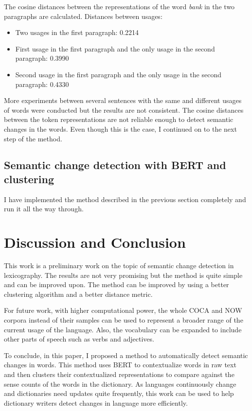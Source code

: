 \documentclass[11pt]{article}
\begin{document}
The cosine distances between the representations of the word \textit{bank} in the two paragraphs are calculated.
Distances between usages:
\begin{itemize}
  \item Two usages in the first paragraph: 0.2214
  \item First usage in the first paragraph and the only usage in the second paragraph: 0.3990
  \item Second usage in the first paragraph and the only usage in the second paragraph: 0.4330
\end{itemize}

More experiments between several sentences with the same and different usages of words were conducted but the results are not consistent.
The cosine distances between the token representations are not reliable enough to detect semantic changes in the words.
Even though this is the case, I continued on to the next step of the method.

\subsection{Semantic change detection with BERT and clustering}

I have implemented the method described in the previous section completely and run it all the way through.


\section{Discussion and Conclusion}

This work is a preliminary work on the topic of semantic change detection in lexicography.
The results are not very promising but the method is quite simple and can be improved upon.
The method can be improved by using a better clustering algorithm and a better distance metric.

For future work, with higher computational power, the whole COCA and NOW corpora instead of their samples can be used to represent a broader range of the current usage of the language.
Also, the vocabulary can be expanded to include other parts of speech such as verbs and adjectives.

To conclude, in this paper, I proposed a method to automatically detect semantic changes in words.
This method uses BERT to contextualize words in raw text and then clusters their contextualized representations to compare against the sense counts of the words in the dictionary.
As languages continuously change and dictionaries need updates quite frequently, this work can be used to help dictionary writers detect changes in language more efficiently.



\end{document}
